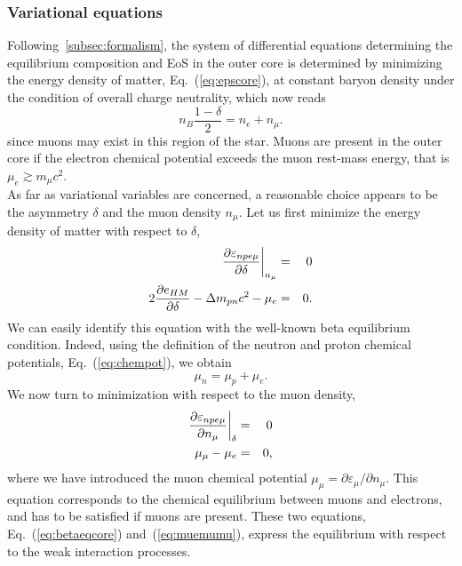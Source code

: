 \subsubsection{Variational equations}

Following~\ref{subsec:formalism}, the system of differential equations
determining the equilibrium composition and EoS in the outer core is
determined by minimizing the energy density of matter, Eq.~(\ref{eq:epscore}), 
at constant baryon density under the condition of overall charge neutrality, 
which now reads
%
\begin{equation}
  n_B\frac{1-\delta}{2} = n_e + n_{\mu}.\label{eq:chargecon}
\end{equation} 
%
since muons may exist in this region of the star. Muons are present in
the outer core if the electron chemical potential exceeds the muon rest-mass 
energy, that is $\mu_e \gtrsim m_\mu c^2$.\\
As far as variational variables are concerned, a reasonable choice appears to
be the asymmetry $\delta$ and the muon density $n_{\mu}$. Let us first minimize
the energy density of matter with respect to $\delta$,
%
\begin{eqnarray}
  \frac{\partial \varepsilon_{npe\mu}}{\partial \delta}\bigg|_{n_\mu} &=&
  0\notag \\
  2\frac{\partial e_{HM}}{\partial \delta} - \Delta m_{pn}c^2 - \mu_e &=& 0.
\end{eqnarray}
%
We can easily identify this equation with the well-known beta equilibrium 
condition. Indeed, using the definition of the neutron and proton chemical 
potentials, Eq.~(\ref{eq:chempot}), we obtain
%
\begin{equation}
  \mu_n = \mu_p + \mu_e.\label{eq:betaeqcore}
\end{equation}
%
We now turn to minimization with respect to the muon density,
%
\begin{eqnarray}
  \frac{\partial \varepsilon_{npe\mu}}{\partial n_{\mu}}\bigg|_{\delta} &=&
  0\notag\\
  \mu_{\mu} - \mu_e &=& 0,\label{eq:muemumu}
\end{eqnarray}
%
where we have introduced the muon chemical potential $\mu_\mu = \partial
\varepsilon_\mu/\partial n_\mu$. This equation corresponds to the chemical 
equilibrium between muons and electrons, and has to be satisfied if muons are 
present. These two equations, Eq.~(\ref{eq:betaeqcore}) and~(\ref{eq:muemumu}), 
express the equilibrium with respect to the weak interaction processes. 

